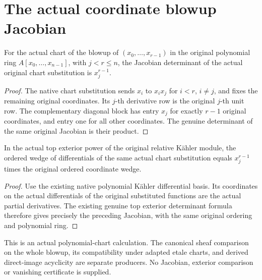 \section{The actual coordinate blowup Jacobian}

\begin{lemma}
\label{lem:kn-blowup-canonical-coordinate-jacobian}
\leanok
For the actual chart of the blowup of
$(x_0,\ldots,x_{r-1})$ in the original polynomial ring
$A[x_0,\ldots,x_{n-1}]$, with $j<r\leq n$, the Jacobian determinant of
the actual original chart substitution is $x_j^{r-1}$.
\end{lemma}
\begin{proof}
The native chart substitution sends $x_i$ to $x_ix_j$ for
$i<r$, $i\ne j$, and fixes the remaining original coordinates.
Its $j$-th derivative row is the original $j$-th unit row. The complementary
diagonal block has entry $x_j$ for exactly $r-1$ original coordinates,
and entry one for all other coordinates. The genuine determinant of the
same original Jacobian is their product.
\end{proof}

\begin{theorem}
\label{thm:kn-blowup-canonical-coordinate-wedge}
\leanok
{}
In the actual top exterior power of the original relative Kähler module,
the ordered wedge of differentials of the same actual chart substitution
equals $x_j^{r-1}$ times the original ordered coordinate wedge.
\end{theorem}
\begin{proof}
Use the existing native polynomial Kähler differential basis. Its
coordinates on the actual differentials of the original substituted
functions are the actual partial derivatives. The existing genuine top
exterior determinant formula therefore gives precisely the preceding
Jacobian, with the same original ordering and polynomial ring.
\end{proof}

\begin{remark}[Scope]
This is an actual polynomial-chart calculation. The canonical sheaf
comparison on the whole blowup, its compatibility under adapted etale
charts, and derived direct-image acyclicity are separate producers.
No Jacobian, exterior comparison or vanishing certificate is supplied.
\end{remark}
